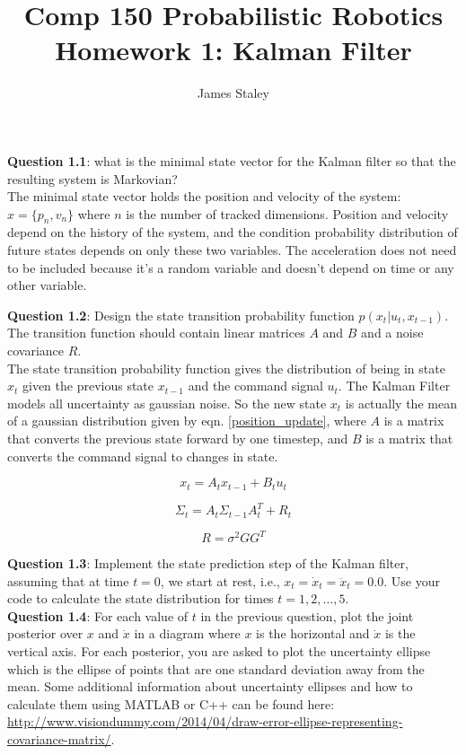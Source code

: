 \documentclass{article}
\title{Comp 150 Probabilistic Robotics Homework 1: Kalman Filter}
\author{James Staley}
\date{\vspace{-2em}}
\begin{document}
\maketitle
{\bf Question 1.1}: what is the minimal state vector for the Kalman filter so that the resulting system is Markovian?\\

The minimal state vector holds the position and velocity of the system: $x = \{p_n, v_n\}$ where $n$ is the number of tracked dimensions. Position and velocity depend on the history of the system, and the condition probability distribution of future states depends on only these two variables. The acceleration does not need to be included because it's a random variable and doesn't depend on time or any other variable. 

{\bf Question 1.2}: Design the state transition probability function $p(x_t | u_t, x_{t-1})$. The transition function should contain linear matrices $A$ and $B$ and a noise covariance $R$.\\

The state transition probability function gives the distribution of being in state $x_t$ given the previous state $x_{t-1}$ and the command signal $u_t$. The Kalman Filter models all uncertainty as gaussian noise. So the new state $x_t$ is actually the mean of a gaussian distribution given by eqn. \ref{position_update}, where $A$ is a matrix that converts the previous state forward by one timestep, and $B$ is a matrix that converts the command signal to changes in state. 

\begin{equation}\label{position_update}
    x_t = A_t x_{t-1} + B_t u_t
\end{equation}

\begin{equation}\label{covariance_update}
    \Sigma_t = A_t \Sigma_{t-1} A^T_t + R_t
\end{equation}

\begin{equation}\label{R_calc}
    R = \sigma^2 G G^T
\end{equation}

{\bf Question 1.3}: Implement the state prediction step of the Kalman filter, assuming that at time $t = 0$, we start at rest, i.e., $x_t = \dot{x}_t = \ddot{x}_t = 0.0$. Use your code to calculate the state distribution for times $t = 1, 2, \ldots, 5$.\\

{\bf Question 1.4}: For each value of $t$ in the previous question, plot the joint posterior over $x$ and $\dot{x}$ in a diagram where $x$ is the horizontal and $\dot{x}$ is the vertical axis. For each posterior, you are asked to plot the uncertainty ellipse which is the ellipse of points that are one standard deviation away from the mean. Some additional information about uncertainty ellipses and how to calculate them using MATLAB or C++ can be found here: \url{http://www.visiondummy.com/2014/04/draw-error-ellipse-representing-covariance-matrix/}.
\end{document}
